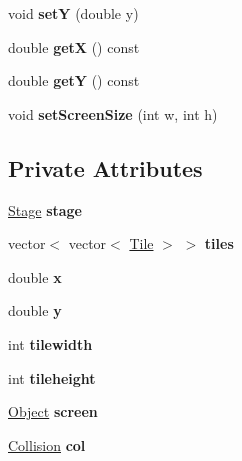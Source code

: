 \begin{DoxyCompactItemize}
\item 
void {\bfseries setY} (double y)\hypertarget{classLevel_a7c67443008f7e0f4b5d1630ff2dcf179}{}\label{classLevel_a7c67443008f7e0f4b5d1630ff2dcf179}

\item 
double {\bfseries getX} () const \hypertarget{classLevel_a6f5dca509c0e480d8a7b6b1d6b411375}{}\label{classLevel_a6f5dca509c0e480d8a7b6b1d6b411375}

\item 
double {\bfseries getY} () const \hypertarget{classLevel_acb5b4e5e0bf364142fa0facc7badea4a}{}\label{classLevel_acb5b4e5e0bf364142fa0facc7badea4a}

\item 
void {\bfseries set\+Screen\+Size} (int w, int h)\hypertarget{classLevel_a22a202624bb540acc74b678b74b60c9d}{}\label{classLevel_a22a202624bb540acc74b678b74b60c9d}

\end{DoxyCompactItemize}
\subsection*{Private Attributes}
\begin{DoxyCompactItemize}
\item 
\hyperlink{classStage}{Stage} {\bfseries stage}\hypertarget{classLevel_a70b63ddb6ddfa55ddf21ba9ee1ceea7b}{}\label{classLevel_a70b63ddb6ddfa55ddf21ba9ee1ceea7b}

\item 
vector$<$ vector$<$ \hyperlink{classTile}{Tile} $>$ $>$ {\bfseries tiles}\hypertarget{classLevel_aca83d54bba8108db360d158c23cf3b05}{}\label{classLevel_aca83d54bba8108db360d158c23cf3b05}

\item 
double {\bfseries x}\hypertarget{classLevel_aec07d9a0c48ff9e91faa4bfd963ce7ac}{}\label{classLevel_aec07d9a0c48ff9e91faa4bfd963ce7ac}

\item 
double {\bfseries y}\hypertarget{classLevel_a8a0e61d7df45f96fd93deff6d52c6d57}{}\label{classLevel_a8a0e61d7df45f96fd93deff6d52c6d57}

\item 
int {\bfseries tilewidth}\hypertarget{classLevel_ac8ef0ca1e4fd96fa82c32bf59767d051}{}\label{classLevel_ac8ef0ca1e4fd96fa82c32bf59767d051}

\item 
int {\bfseries tileheight}\hypertarget{classLevel_a206b74c28bb8eb3be5bf30f7611815dc}{}\label{classLevel_a206b74c28bb8eb3be5bf30f7611815dc}

\item 
\hyperlink{classObject}{Object} {\bfseries screen}\hypertarget{classLevel_ae40a7c1aec8beb39a60876d07338f88f}{}\label{classLevel_ae40a7c1aec8beb39a60876d07338f88f}

\item 
\hyperlink{classCollision}{Collision} {\bfseries col}\hypertarget{classLevel_a703a2892808b942817dd84072de22bc5}{}\label{classLevel_a703a2892808b942817dd84072de22bc5}

\end{DoxyCompactItemize}


